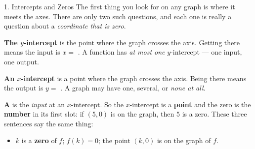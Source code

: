 \documentclass[10pt]{article}
\begin{document}
\boxguard[30]
\begin{notesbox}{1. Intercepts and Zeros}
\small
The first thing you look for on any graph is where it meets the axes. There are only two such
questions, and each one is really a question about a \emph{coordinate that is zero}.

\vspace{4pt}
\textbf{The $y$-intercept} is the point where the graph crosses the  axis. Getting
there means the input is $x=$ . A function has \emph{at most one} $y$-intercept --- one
input, one output.

\vspace{2pt}
\textbf{An $x$-intercept} is a point where the graph crosses the  axis. Being there
means the output is $y=$ . A graph may have one, several, or \emph{none at all}.

\vspace{2pt}
\textbf{A } is the \emph{input} at an $x$-intercept. So the $x$-intercept is a
\textbf{point} and the zero is the \textbf{number} in its first slot: if $(5,0)$ is on the graph,
then $5$ is a zero. These three sentences say the same thing:
\begin{itemize}[leftmargin=1.3em, itemsep=1pt, topsep=3pt]
  \item $k$ is a \textbf{zero} of $f$; \quad $f(k)=0$; \quad the point $(k,0)$ is on the graph of $f$.
\end{itemize}


\end{notesbox}
\end{document}
